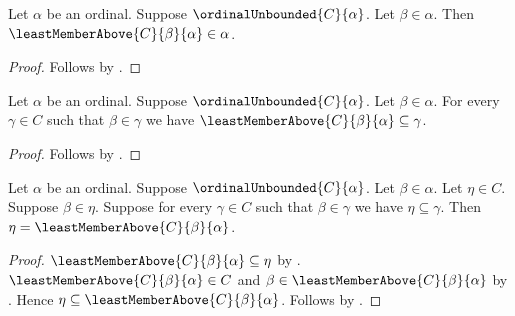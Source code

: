 \begin{proposition}\label{least_member_above_below_ambient}
    Let $\alpha$ be an ordinal.
    Suppose $\ordinalUnbounded{C}{\alpha}$.
    Let $\beta\in\alpha$.
    Then $\leastMemberAbove{C}{\beta}{\alpha}\in\alpha$.
\end{proposition}
\begin{proof}
    Follows by .
\end{proof}

\begin{proposition}\label{least_member_above_least}
    Let $\alpha$ be an ordinal.
    Suppose $\ordinalUnbounded{C}{\alpha}$.
    Let $\beta\in\alpha$.
    For every $\gamma\in C$ such that $\beta\in\gamma$ we have
        $\leastMemberAbove{C}{\beta}{\alpha}\subseteq\gamma$.
\end{proposition}
\begin{proof}
    Follows by .
\end{proof}

\begin{proposition}\label{least_member_above_unique}
    Let $\alpha$ be an ordinal.
    Suppose $\ordinalUnbounded{C}{\alpha}$.
    Let $\beta\in\alpha$.
    Let $\eta\in C$.
    Suppose $\beta\in\eta$.
    Suppose for every $\gamma\in C$ such that $\beta\in\gamma$ we have
        $\eta\subseteq\gamma$.
    Then $\eta=\leastMemberAbove{C}{\beta}{\alpha}$.
\end{proposition}
\begin{proof}
    $\leastMemberAbove{C}{\beta}{\alpha}\subseteq\eta$
        by .
    $\leastMemberAbove{C}{\beta}{\alpha}\in C$ and
        $\beta\in\leastMemberAbove{C}{\beta}{\alpha}$
        by .
    Hence $\eta\subseteq\leastMemberAbove{C}{\beta}{\alpha}$.
    Follows by .
\end{proof}

